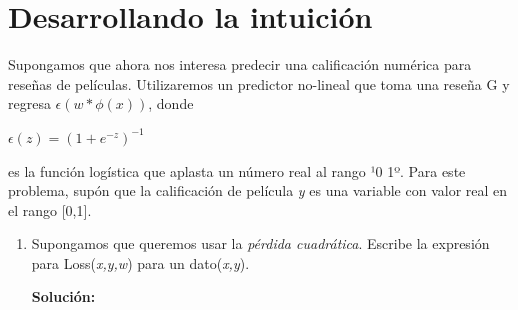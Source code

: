 \documentclass[11pt,letterpaper]{article}
\newenvironment{solution}{%
  \noindent\begin{shaded}
  \textbf{Solución:}\ }{
  \end{shaded}%
}
\begin{document}
\section*{Desarrollando la intuición}

Supongamos que ahora nos interesa predecir una calificación numérica para reseñas de películas. Utilizaremos un predictor no-lineal que toma una reseña G y regresa \begin{math}
    \epsilon(w*\phi(x))
\end{math}, donde

\begin{center}
    \begin{math}
        \epsilon(z)=(1+e^{-z})^{-1}
    \end{math}
\end{center}

es la función logística que aplasta un número real al rango ¹0 1º. Para este problema, supón que la calificación de película \textit{y} es una variable con valor real en el rango [0,1].

\begin{enumerate}
    \item Supongamos que queremos usar la \textit{pérdida cuadrática}. Escribe la expresión para Loss(\textit{x,y,w}) para un dato(\textit{x,y}).

    \begin{solution}
        
    \end{solution}
\end{enumerate}
\end{document}
